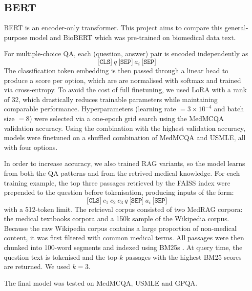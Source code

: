 \documentclass{article}
\begin{document}
\subsection{BERT}
BERT \cite{devlin2019bertpretrainingdeepbidirectional} is an encoder-only transformer. This project aims to compare this general-purpose model and BioBERT \cite{Lee_2019} which was pre-trained on biomedical data text.

For multiple-choice QA, each (question, answer) pair is encoded independently as
\begin{equation}
    \texttt{[CLS]}\ q\ \texttt{[SEP]}\ a_i\ \texttt{[SEP]}
\end{equation}
The classification token embedding is then passed through a linear head to produce a score per option, which are are normalised with softmax and trained via cross-entropy. To avoid the cost of full finetuning, we used LoRA \cite{hu2021loralowrankadaptationlarge} with a rank of 32, which drastically reduces trainable parameters while maintaining comparable performance. Hyperparameters (learning rate $=3\times10^{-4}$ and batch size $=8$) were selected via a one-epoch grid search using the MedMCQA validation accuracy. Using the combination with the highest validation accuracy, models were finetuned on a shuffled combination of MedMCQA and USMLE, all with four options.

In order to increase accuracy, we also trained RAG \cite{lewis2021retrievalaugmentedgenerationknowledgeintensivenlp} variants, so the model learns from both the QA patterns and from the retrived medical knowledge. For each training example, the top three passages retrieved by the FAISS index \cite{douze2025faisslibrary} were prepended to the question before tokenisation, producing inputs of the form:
\begin{equation}
    \texttt{[CLS]}\ c_1\ c_2\ c_3\ q\ \texttt{[SEP]}\ a_i\ \texttt{[SEP]}
\end{equation}
with a 512-token limit. The retrieval corpus consisted of two MedRAG corpora: the medical textbooks corpora and a 150k sample of the Wikipedia corpus. Because the raw Wikipedia corpus contains a large proportion of non-medical content, it was first filtered with common medical terms. All passages were then chunked into 100-word segments and indexed using BM25s \cite{lewis2021retrievalaugmentedgenerationknowledgeintensivenlp}. At query time, the question text is tokenised and the top-$k$ passages with the highest BM25 scores are returned. We used $k=3$.

The final model was tested on MedMCQA, USMLE and GPQA.
\end{document}
